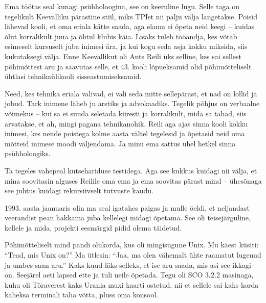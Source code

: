 
Ema töötas seal kunagi psühholoogina, see on keeruline lugu. Selle taga on 
tegelikult Keevalliku pärastine stiil, miks TPIst nii palju välja 
langetakse. Poisid lähevad kooli, et oma eriala kätte saada, aga elama ei õpeta neid keegi -- kuidas õlut korralikult 
juua ja õhtul klubis käia. Lisaks tuleb tööandja, kes võtab esimeselt 
kursuselt juba inimesi ära, ja kui kogu seda asja kokku miksida, siis kukutaksegi välja. 
Enne Keevallikut oli Ants Reili üks selline, kes 
sai sellest põhimõttest aru ja saavutas selle, et 43. kooli lõpueksamid olid põhimõtteliselt ühtlasi 
tehnikaülikooli sisseastumiseksamid. 

Need, kes tehnika eriala valivad, ei vali seda 
mitte sellepärast, et nad on lollid ja jobud. Tark inimene läheb ju arstiks ja 
advokaadiks. Tegelik põhjus on verbaalne võimekus -- 
kui sa ei suuda seletada kiiresti ja korralikult, mida sa tahad, siis 
arvatakse, et ah, mingi pagana tehnikanohik. Reili aga
ajas sinna kooli kokku inimesi, kes nende poistega kolme aasta vältel 
tegelesid ja õpetasid neid oma mõtteid inimese moodi väljendama. Ja minu ema sattus ühel hetkel sinna psühholoogiks. 


Ta tegeles vahepeal kutsehariduse testidega. Aga 
see kukkus kuidagi nii välja, et mina soovitasin alguses 
Reilile oma ema ja ema soovitas pärast mind -- 
ühesõnaga see juhtus kuidagi rekursiivselt tutvuste kaudu. 

1993. aasta jaanuaris olin ma seal igatahes paigas ja mulle öeldi, et neljandast 
veerandist pean hakkama juba kellelegi midagi 
õpetama. See oli teisejärguline, kellele ja mida,
projekti eesmärgid pidid olema täidetud.

Põhimõtteliselt mind pandi olukorda, kus oli mingisugune Unix. Mu käest küsiti: \enquote{Tead, mis Unix on?} Ma ütlesin: \enquote{Jaa, ma olen 
vähemalt ühte raamatut lugenud ja umbes saan aru.} Kaks 
kuud läks selleks, et ise aru saada, mis asi see ikkagi on. Seejärel aeti lapsed 
ette ja tuli neile õpetada. Tegu oli SCO 3.2.2 masinaga, kuhu oli 
Tõraverest kaks Urania muxi kaarti ostetud, nii et 
sellele sai kaks korda kaheksa terminali taha võtta, 
pluss oma konsool. 

